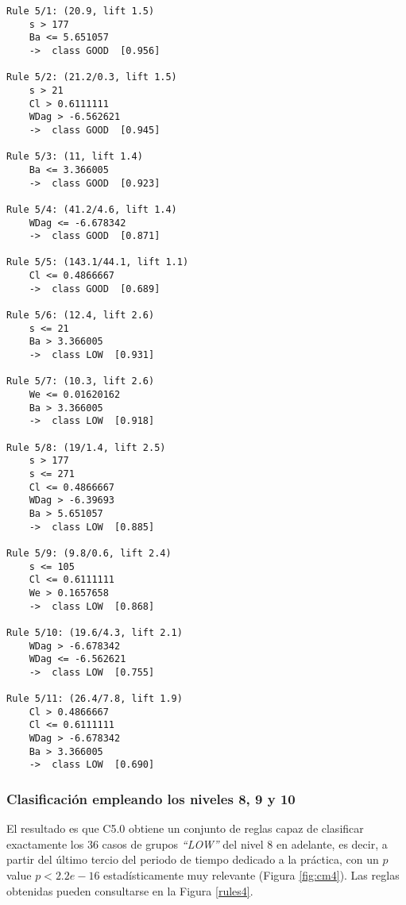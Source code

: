 \begin{tcolorbox}[title=Reglas de clasificación para identificar grupos de tipo \emph{``LOW''}.]
  \makeatletter
  \makeatother
\begin{multicols}{2}
    \begin{verbatim}
Rule 5/1: (20.9, lift 1.5)
	s > 177
	Ba <= 5.651057
	->  class GOOD  [0.956]

Rule 5/2: (21.2/0.3, lift 1.5)
	s > 21
	Cl > 0.6111111
	WDag > -6.562621
	->  class GOOD  [0.945]

Rule 5/3: (11, lift 1.4)
	Ba <= 3.366005
	->  class GOOD  [0.923]

Rule 5/4: (41.2/4.6, lift 1.4)
	WDag <= -6.678342
	->  class GOOD  [0.871]

Rule 5/5: (143.1/44.1, lift 1.1)
	Cl <= 0.4866667
	->  class GOOD  [0.689]

Rule 5/6: (12.4, lift 2.6)
	s <= 21
	Ba > 3.366005
	->  class LOW  [0.931]

Rule 5/7: (10.3, lift 2.6)
	We <= 0.01620162
	Ba > 3.366005
	->  class LOW  [0.918]

Rule 5/8: (19/1.4, lift 2.5)
	s > 177
	s <= 271
	Cl <= 0.4866667
	WDag > -6.39693
	Ba > 5.651057
	->  class LOW  [0.885]

Rule 5/9: (9.8/0.6, lift 2.4)
	s <= 105
	Cl <= 0.6111111
	We > 0.1657658
	->  class LOW  [0.868]

Rule 5/10: (19.6/4.3, lift 2.1)
	WDag > -6.678342
	WDag <= -6.562621
	->  class LOW  [0.755]

Rule 5/11: (26.4/7.8, lift 1.9)
	Cl > 0.4866667
	Cl <= 0.6111111
	WDag > -6.678342
	Ba > 3.366005
	->  class LOW  [0.690]
    \end{verbatim}
  \end{multicols}
\label{rules1}
\end{tcolorbox}

\subsubsection{Clasificación empleando los niveles 8, 9 y 10}

El resultado es que C5.0 obtiene un conjunto de reglas capaz de clasificar exactamente los $36$ casos de grupos \emph{``LOW''} del nivel $8$ en adelante, es decir, a partir del último tercio del periodo de tiempo dedicado a la práctica, con un $p$ value $p < 2.2e-16$ estadísticamente muy relevante (Figura \ref{fig:cm4}). Las reglas obtenidas pueden consultarse en la Figura \ref{rules4}.

